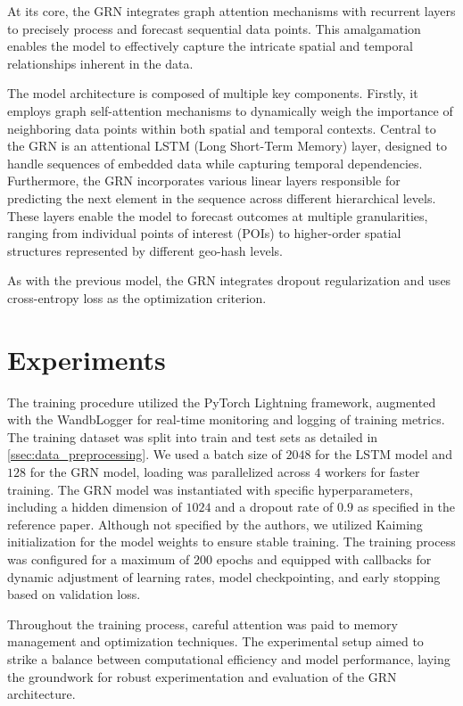 \documentclass[twocolumn,twoside]{article}
\begin{document}
At its core, the GRN integrates graph attention mechanisms
with recurrent layers to precisely process and forecast sequential data points.
This amalgamation enables the model to effectively capture the intricate
spatial and temporal relationships inherent in the data.

The model architecture is composed of multiple key components. Firstly, it employs
graph self-attention mechanisms to dynamically weigh the importance of
neighboring data points within both spatial and temporal contexts.
Central to the GRN is an attentional LSTM (Long Short-Term Memory) layer,
designed to handle sequences of embedded data while capturing temporal
dependencies. Furthermore, the GRN incorporates various linear layers
responsible for predicting the next element in the sequence across
different hierarchical levels. These layers enable the model to forecast
outcomes at multiple granularities, ranging from individual points of interest
(POIs) to higher-order spatial structures represented by different geo-hash levels.

As with the previous model, the GRN integrates dropout regularization and uses
cross-entropy loss as the optimization criterion.

\section{Experiments}
The training procedure utilized the PyTorch Lightning framework\cite{lightning},
augmented with the WandbLogger for real-time monitoring and logging of
training metrics. The training dataset was split into train and test sets as detailed in \cref{ssec:data_preprocessing}.
We used a batch size of $2048$ for the LSTM model and $128$ for the GRN model, 
loading was parallelized across $4$ workers for faster training. The GRN model was instantiated with specific
hyperparameters, including a hidden dimension of $1024$ and a dropout rate of $0.9$
as specified in the reference paper. Although not specified by the authors, we utilized 
Kaiming initialization\cite{kaiming} for the model weights to ensure stable training.
The training process was configured
for a maximum of $200$ epochs and equipped with callbacks for dynamic
adjustment of learning rates, model checkpointing, and early
stopping based on validation loss.

Throughout the training process, careful attention was paid to memory
management and optimization techniques. The experimental setup aimed to
strike a balance between computational efficiency and model performance,
laying the groundwork for robust experimentation and evaluation of the
GRN architecture.
\end{document}
